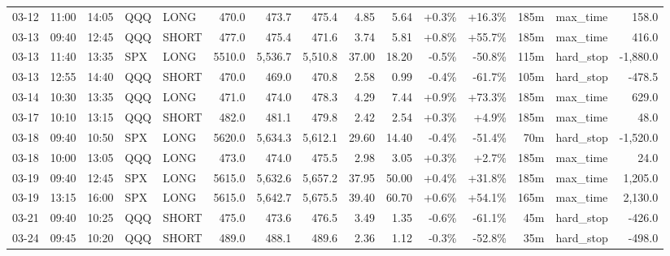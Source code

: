 \documentclass[11pt,a4paper,twoside]{article}
\begin{document}
\begin{landscape}
\begin{center}
\begin{longtable}{>{\color{txtmain}}l l l l l r r r r r r r r >{\color{txtmain}}l r}
03-12 & 11:00 & 14:05 & QQQ & LONG & 470.0 & 473.7 & 475.4 & 4.85 & 5.64 & \textcolor{wingreen}{+0.3\%} & \textcolor{wingreen}{+16.3\%} & 185m & max\_time & \textcolor{wingreen}{158.0} \\
03-13 & 09:40 & 12:45 & QQQ & SHORT & 477.0 & 475.4 & 471.6 & 3.74 & 5.81 & \textcolor{wingreen}{+0.8\%} & \textcolor{wingreen}{+55.7\%} & 185m & max\_time & \textcolor{wingreen}{416.0} \\
03-13 & 11:40 & 13:35 & SPX & LONG & 5510.0 & 5,536.7 & 5,510.8 & 37.00 & 18.20 & \textcolor{lossred}{-0.5\%} & \textcolor{lossred}{-50.8\%} & 115m & hard\_stop & \textcolor{lossred}{-1,880.0} \\
03-13 & 12:55 & 14:40 & QQQ & SHORT & 470.0 & 469.0 & 470.8 & 2.58 & 0.99 & \textcolor{lossred}{-0.4\%} & \textcolor{lossred}{-61.7\%} & 105m & hard\_stop & \textcolor{lossred}{-478.5} \\
03-14 & 10:30 & 13:35 & QQQ & LONG & 471.0 & 474.0 & 478.3 & 4.29 & 7.44 & \textcolor{wingreen}{+0.9\%} & \textcolor{wingreen}{+73.3\%} & 185m & max\_time & \textcolor{wingreen}{629.0} \\
03-17 & 10:10 & 13:15 & QQQ & SHORT & 482.0 & 481.1 & 479.8 & 2.42 & 2.54 & \textcolor{wingreen}{+0.3\%} & \textcolor{wingreen}{+4.9\%} & 185m & max\_time & \textcolor{wingreen}{48.0} \\
03-18 & 09:40 & 10:50 & SPX & LONG & 5620.0 & 5,634.3 & 5,612.1 & 29.60 & 14.40 & \textcolor{lossred}{-0.4\%} & \textcolor{lossred}{-51.4\%} & 70m & hard\_stop & \textcolor{lossred}{-1,520.0} \\
03-18 & 10:00 & 13:05 & QQQ & LONG & 473.0 & 474.0 & 475.5 & 2.98 & 3.05 & \textcolor{wingreen}{+0.3\%} & \textcolor{wingreen}{+2.7\%} & 185m & max\_time & \textcolor{wingreen}{24.0} \\
03-19 & 09:40 & 12:45 & SPX & LONG & 5615.0 & 5,632.6 & 5,657.2 & 37.95 & 50.00 & \textcolor{wingreen}{+0.4\%} & \textcolor{wingreen}{+31.8\%} & 185m & max\_time & \textcolor{wingreen}{1,205.0} \\
03-19 & 13:15 & 16:00 & SPX & LONG & 5615.0 & 5,642.7 & 5,675.5 & 39.40 & 60.70 & \textcolor{wingreen}{+0.6\%} & \textcolor{wingreen}{+54.1\%} & 165m & max\_time & \textcolor{wingreen}{2,130.0} \\
03-21 & 09:40 & 10:25 & QQQ & SHORT & 475.0 & 473.6 & 476.5 & 3.49 & 1.35 & \textcolor{lossred}{-0.6\%} & \textcolor{lossred}{-61.1\%} & 45m & hard\_stop & \textcolor{lossred}{-426.0} \\
03-24 & 09:45 & 10:20 & QQQ & SHORT & 489.0 & 488.1 & 489.6 & 2.36 & 1.12 & \textcolor{lossred}{-0.3\%} & \textcolor{lossred}{-52.8\%} & 35m & hard\_stop & \textcolor{lossred}{-498.0} \\

\end{longtable}
\end{center}
\end{landscape}
\end{document}
